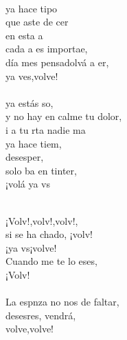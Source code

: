 \begin{cancion}
\begin{chorus}
	\end{chorus}%
	\jump\\
	ya hace tipo\\
	que aste de cer\\
	 en esta a \\
	cada a es importae,\\
	día mes pensadolvá a er,\\
	ya ves,volve!\\
\jump\\
	ya estás so,\\
	y no hay en calme tu dolor,\\
	i a tu rta nadie ma \\
	ya hace tiem,\\
	desesper, \\
	solo ba en tinter,\\
	¡volá ya vs\\\jump\\
	\begin{chorus}%
	¡Volv!,volv!,volv!,     \\
	si se ha chado, ¡volv!\\
	¡ya vs¡volve!\\
	Cuando me te lo eses,\\
	¡Volv!\\
\jump\\
	La espnza no nos  de faltar,\\
	desesres, vendrá,\\
	volve,volve!\\
	\end{chorus}%
	\jump\\
\end{cancion}%
